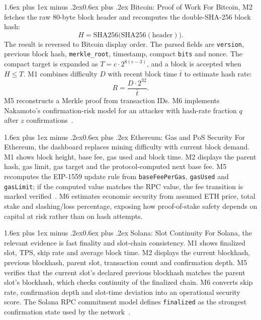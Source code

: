 \documentclass[11pt,a4paper]{article}
\makeatletter
\renewcommand{\subsection}{\@startsection{subsection}{2}{0pt}%
  {1.6ex plus 1ex minus .2ex}{0.6ex plus .2ex}%
  {\color{btcgreensoft!60!black}\normalsize\bfseries\sffamily}}
\makeatother
\begin{document}
\subsection{Bitcoin: Proof of Work}
For Bitcoin, M2 fetches the raw 80-byte block header and recomputes
the double-SHA-256 block hash:
\[
    H=\mathrm{SHA256}\bigl(\mathrm{SHA256}(\text{header})\bigr).
\]
The result is reversed to Bitcoin display order. The parsed fields are
\texttt{version}, previous block hash,
\texttt{merkle\_root}, timestamp, compact \texttt{bits} and nonce. The compact
target is expanded as $T=c\cdot2^{8(e-3)}$, and a block is accepted when
$H\leq T$. M1 combines difficulty $D$ with recent block time $\bar{t}$ to
estimate hash rate:
\[
    R=\frac{D\cdot2^{32}}{\bar{t}}.
\]
M5 reconstructs a Merkle proof from transaction IDs. M6 implements Nakamoto's
confirmation-risk model for an attacker with hash-rate fraction $q$ after $z$
confirmations~\cite[\S11]{nakamoto2008}.

\subsection{Ethereum: Gas and PoS Security}
For Ethereum, the dashboard replaces mining difficulty with current block
demand. M1 shows block height, base fee, gas used and block time. M2 displays
the parent hash, gas limit, gas target and the protocol-computed next base
fee. M5 recomputes the EIP-1559 update rule from
\texttt{baseFeePerGas}, \texttt{gasUsed} and \texttt{gasLimit}; if the
computed value matches the RPC value, the fee transition is marked
verified~\cite{eip1559}.
M6 estimates economic security from assumed ETH price, total stake and
slashing/loss percentage, exposing how proof-of-stake safety depends on capital
at risk rather than on hash attempts.

\subsection{Solana: Slot Continuity}
For Solana, the relevant evidence is fast finality and slot-chain consistency.
M1 shows finalized slot, TPS, skip rate and average block time. M2 displays
the current blockhash, previous blockhash, parent slot, transaction count and
confirmation depth. M5 verifies that the current slot's declared previous
blockhash matches the parent slot's blockhash, which checks continuity of the
finalized chain. M6 converts skip rate, confirmation depth and slot-time
deviation into an operational security score. The Solana RPC commitment model
defines \texttt{finalized} as the strongest confirmation state used by the
network~\cite{solana_rpc}.
\end{document}
